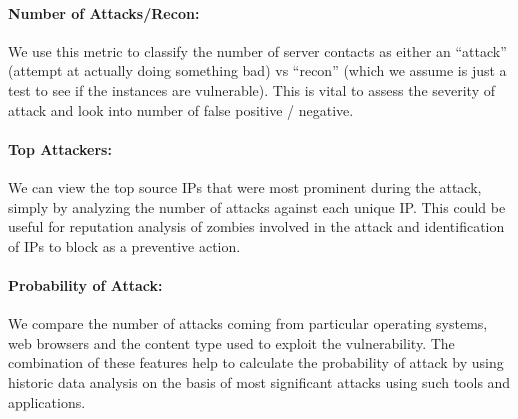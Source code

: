 \paragraph{Number of Attacks/Recon:}
We use this metric to classify the number of server contacts as either an “attack” (attempt at actually doing something bad) vs “recon” (which we assume is just a test to see if the instances are vulnerable). This is vital to assess the severity of attack and look into number of false positive / negative.
\indent
\paragraph{Top Attackers:}
We can view the top source IPs that were most prominent during the attack, simply by analyzing the number of attacks against each unique IP. This could be useful for reputation analysis of zombies involved in the attack and identification of IPs to block as a preventive action.
\indent
\paragraph{Probability of Attack:}
We compare the number of attacks coming from particular operating systems, web browsers and the content type used to exploit the vulnerability. The combination of these features help to calculate the probability of attack by using historic data analysis on the basis of most significant attacks using such tools and applications.
